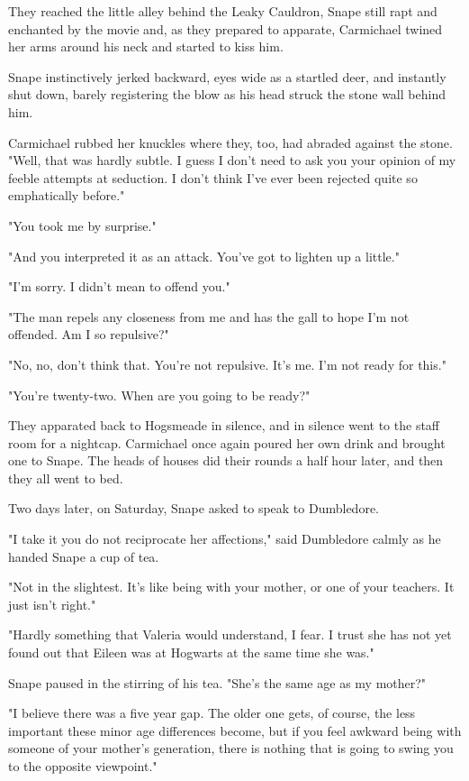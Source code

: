 \documentclass[a4paper,11pt]{article}
\begin{document}
They reached the little alley behind the Leaky Cauldron, Snape still rapt and enchanted by the movie and, as they prepared to apparate, Carmichael twined her arms around his neck and started to kiss him.

Snape instinctively jerked backward, eyes wide as a startled deer, and instantly shut down, barely registering the blow as his head struck the stone wall behind him.

Carmichael rubbed her knuckles where they, too, had abraded against the stone. "Well, that was hardly subtle. I guess I don't need to ask you your opinion of my feeble attempts at seduction. I don't think I've ever been rejected quite so emphatically before."

"You took me by surprise."

"And you interpreted it as an attack. You've got to lighten up a little."

"I'm sorry. I didn't mean to offend you."

"The man repels any closeness from me and has the gall to hope I'm not offended. Am I so repulsive?"

"No, no, don't think that. You're not repulsive. It's me. I'm not ready for this."

"You're twenty-two. When are you going to be ready?"

They apparated back to Hogsmeade in silence, and in silence went to the staff room for a nightcap. Carmichael once again poured her own drink and brought one to Snape. The heads of houses did their rounds a half hour later, and then they all went to bed.

Two days later, on Saturday, Snape asked to speak to Dumbledore.

"I take it you do not reciprocate her affections," said Dumbledore calmly as he handed Snape a cup of tea.

"Not in the slightest. It's like being with your mother, or one of your teachers. It just isn't right."

"Hardly something that Valeria would understand, I fear. I trust she has not yet found out that Eileen was at Hogwarts at the same time she was."

Snape paused in the stirring of his tea. "She's the same age as my mother?"

"I believe there was a five year gap. The older one gets, of course, the less important these minor age differences become, but if you feel awkward being with someone of your mother's generation, there is nothing that is going to swing you to the opposite viewpoint."
\end{document}
